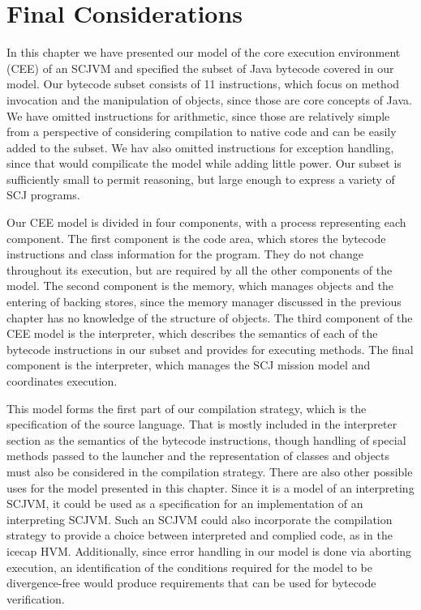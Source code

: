 

\section{Final Considerations}
\label{cee-final-considerations-section}

In this chapter we have presented our model of the core execution
environment (CEE) of an SCJVM and specified the subset of Java
bytecode covered in our model.
Our bytecode subset consists of 11 instructions, which focus on method
invocation and the manipulation of objects, since those are core
concepts of Java.
We have omitted instructions for arithmetic, since those are
relatively simple from a perspective of considering compilation to
native code and can be easily added to the subset.
We hav also omitted instructions for exception handling, since that
would compilicate the model while adding little power.
Our subset is sufficiently small to permit reasoning, but large enough
to express a variety of SCJ programs.

Our CEE model is divided in four components, with a \Circus{} process
representing each component.
The first component is the code area, which stores the bytecode
instructions and class information for the program.
They do not change throughout its execution, but are required by all
the other components of the model.
The second component is the memory, which manages objects and the
entering of backing stores, since the memory manager discussed in the
previous chapter has no knowledge of the structure of objects.
The third component of the CEE model is the interpreter, which
describes the semantics of each of the bytecode instructions in our
subset and provides for executing methods.
The final component is the interpreter, which manages the SCJ mission
model and coordinates execution.

This model forms the first part of our compilation strategy, which is
the specification of the source language.
That is mostly included in the interpreter section as the semantics of
the bytecode instructions, though handling of special methods passed
to the launcher and the representation of classes and objects must
also be considered in the compilation strategy.
There are also other possible uses for the model presented in this
chapter.
Since it is a model of an interpreting SCJVM, it could be used as a
specification for an implementation of an interpreting SCJVM.
Such an SCJVM could also incorporate the compilation strategy to
provide a choice between interpreted and complied code, as in the
icecap HVM.
Additionally, since error handling in our model is done via aborting
execution, an identification of the conditions required for the model
to be divergence-free would produce requirements that can be used for
bytecode verification.
